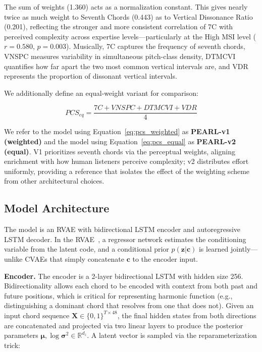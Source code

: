 \documentclass[conference]{IEEEtran}
\begin{document}
The sum of weights (1.360) acts as a normalization constant. This gives nearly twice as much weight to Seventh Chords (0.443) as to Vertical Dissonance Ratio (0.201), reflecting the stronger and more consistent correlation of 7C with perceived complexity across expertise levels---particularly at the High MSI level ($r{=}0.580$, $p{=}0.003$). Musically, 7C captures the frequency of seventh chords, VNSPC measures variability in simultaneous pitch-class density, DTMCVI quantifies how far apart the two most common vertical intervals are, and VDR represents the proportion of dissonant vertical intervals.

We additionally define an equal-weight variant for comparison:

\begin{equation}
PCS_{eq} = \frac{7C + VNSPC + DTMCVI + VDR}{4}
\label{eq:pcs_equal}
\end{equation}

We refer to the model using Equation~\ref{eq:pcs_weighted} as \textbf{PEARL-v1 (weighted)} and the model using Equation~\ref{eq:pcs_equal} as \textbf{PEARL-v2 (equal)}. V1 prioritizes seventh chords via the perceptual weights, aligning enrichment with how human listeners perceive complexity; v2 distributes effort uniformly, providing a reference that isolates the effect of the weighting scheme from other architectural choices.

\subsection{Model Architecture}

The model is an RVAE with bidirectional LSTM encoder and autoregressive LSTM decoder. In the RVAE~\cite{comanducci2023vae,zhao2019variational}, a regressor network estimates the conditioning variable from the latent code, and a conditional prior $p(\mathbf{z}|\mathbf{c})$ is learned jointly---unlike CVAEs that simply concatenate $\mathbf{c}$ to the encoder input.

\textbf{Encoder.} The encoder is a 2-layer bidirectional LSTM with hidden size 256. Bidirectionality allows each chord to be encoded with context from both past and future positions, which is critical for representing harmonic function (e.g., distinguishing a dominant chord that resolves from one that does not). Given an input chord sequence $\mathbf{X} \in \{0,1\}^{T \times 48}$, the final hidden states from both directions are concatenated and projected via two linear layers to produce the posterior parameters $\boldsymbol{\mu}, \log\boldsymbol{\sigma}^2 \in \mathbb{R}^{d_z}$. A latent vector is sampled via the reparameterization trick:
\end{document}
